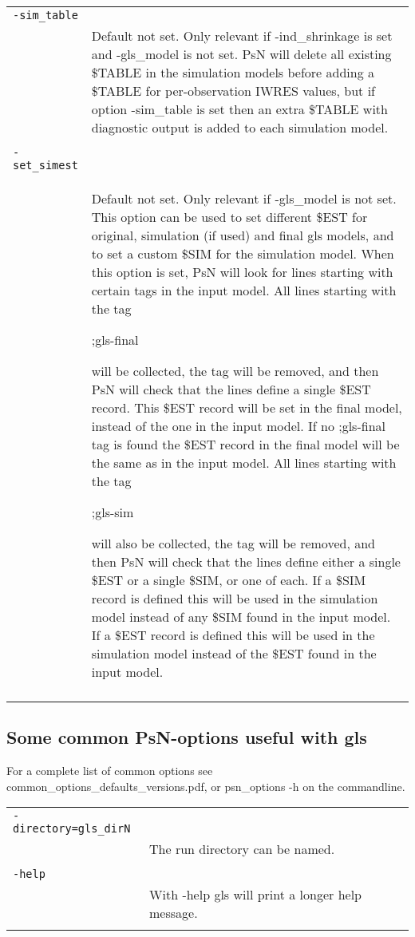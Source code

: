 \documentclass[a4paper,12pt]{article}
\begin{document}
\begin{longtable}{p{1in}p{4in}}
\\
\verb|-sim_table| & \\
\nopagebreak
 &  Default not set. Only relevant if -ind\_shrinkage is set and -gls\_model is not set. PsN will delete all existing \$TABLE in the simulation models before adding a \$TABLE for per-observation IWRES values, but if option -sim\_table is set then an extra \$TABLE with diagnostic output is added to each simulation model. \\
\\
\verb|-set_simest| & \\
\nopagebreak
 &  Default not set. Only relevant if -gls\_model is not set. This option can be used to set different \$EST for original, simulation (if used) and final gls models, and to set a custom \$SIM for the simulation model. When this option is set, PsN will look for lines starting with certain tags in the input model. All lines starting with the tag

;gls-final

will be collected, the tag will be removed, and then PsN will check that the lines define a single \$EST record. This \$EST record will be set in the final model, instead of the one in the input model. If no ;gls-final tag is found the \$EST record in the final model will be the same as in the input model. All lines starting with the tag

;gls-sim

will also be collected, the tag will be removed, and then PsN will check that the lines define either a single \$EST or a single \$SIM, or one of each. If a \$SIM record is defined this will be used in the simulation model instead of any \$SIM found in the input model. If a \$EST record is defined this will be used in the simulation model instead of the \$EST found in the input model.\\
\\
\end{longtable}

\subsection{Some common PsN-options useful with gls}

For a complete list of common options see common\_options\_defaults\_versions.pdf, or psn\_options -h on the commandline.

\begin{longtable}{p{1in}p{4in}}
\verb|-directory=gls_dirN| & \\
\nopagebreak
 & The run directory can be named.  \\
\\
\verb|-help| & \\
\nopagebreak
 & With -help gls will print a longer help message. \\
\\
\end{longtable}
\end{document}

